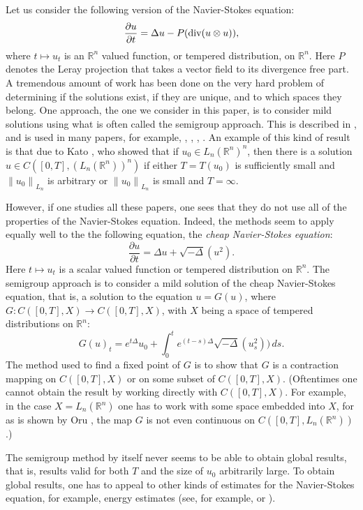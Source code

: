 \documentclass[12pt]{amsart}
\newcommand{\R}{{\mathbb R}}
\newcommand{\snormo}[1]{{\mathopen\|#1\mathclose\|}}
\renewcommand{\div}{\text{\rm div}}
\begin{document}
Let us consider the following version of the Navier-Stokes equation:
\[
\frac{\partial u}{\partial t} = \Delta u - P(\div(u \otimes u)),
\]
where $t \mapsto u_t$ is an $\R^n$ valued function,
or tempered distribution, on $\R^n$.  
Here $P$ denotes the Leray projection that takes
a vector field to its divergence free part.
A tremendous amount of work has been done on
the very hard problem of determining if the solutions exist, if they
are unique, and to which spaces they belong.
One approach, the one we consider in this paper, 
is to consider mild solutions using what is often
called the semigroup approach.  
This is described in \cite{Ca1}, and
is used in many papers, for example, \cite{FK}, \cite{K}, \cite{GM}, \cite{KT}.
An example of this kind of result is that due to Kato \cite{K},
who showed that if $u_0 \in L_n(\R^n)^n$, 
then there is a solution $u \in C([0,T],(L_n(\R^n))^n)$
if either $T=T(u_0)$ is sufficiently 
small and $\snormo{u_0}_{L_n}$ is arbitrary or 
$\snormo{u_0}_{L_n}$ is small and $T=\infty$.
 
However, if one studies all these papers, one sees that they 
do not use all of the properties of the Navier-Stokes equation.  
Indeed, the methods seem to apply equally well to the the following
equation, the {\em cheap Navier-Stokes equation}:
\begin{equation*}
\frac{\partial u}{\partial t} = \Delta u + \sqrt{-\Delta} (u^2) .
\end{equation*}
Here $t\mapsto u_t$ is a scalar valued function or tempered distribution
on $\R^n$.
The semigroup approach is to consider
a mild solution of the cheap Navier-Stokes equation, that is, 
a solution to the equation 
$u = G(u)$,
where $G:C([0,T],X) \to C([0,T],X)$, 
with $X$ being a space of tempered distributions on $\R^n$:
\begin{equation*}
G(u)_t = 
e^{t \Delta} u_0 + \int_0^t e^{(t-s)\Delta} \sqrt{-\Delta}(u_s^2)) \, ds .
\end{equation*}
The method used 
to find a fixed point of $G$ is to show that $G$ is a contraction
mapping on $C([0,T],X)$ or on some subset of $C([0,T],X)$.
(Oftentimes one cannot obtain the result by working directly
with $C([0,T],X)$.  For example, in the case $X = L_n(\R^n)$ one
has to work with some space embedded into $X$, for as is shown by
Oru \cite{O}, the map $G$ is not even continuous on $C([0,T],L_n(\R^n))$.)

The semigroup
method by itself never seems to be able to obtain global results, that is,
results valid for both $T$ and the size of $u_0$ arbitrarily large.  
To obtain global results, one has to appeal to other
kinds of estimates for the Navier-Stokes equation, for example, energy
estimates (see, for example, \cite{KF} or \cite{Ca2}).
\end{document}
